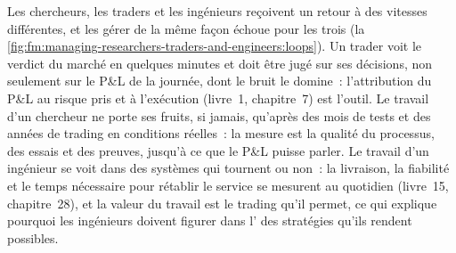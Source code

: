 Les chercheurs, les traders et les ingénieurs reçoivent un retour à des vitesses différentes, et les gérer de la même façon échoue pour les trois
(la \cref{fig:fm:managing-researchers-traders-and-engineers:loops}). Un trader voit le verdict du marché en quelques minutes et doit être jugé sur ses décisions,
non seulement sur le P\&L de la journée, dont le bruit le domine~: l'attribution du P\&L au risque pris et à l'exécution (livre~1, chapitre~7) est
l'outil. Le travail d'un chercheur ne porte ses fruits, si jamais, qu'après des mois de tests et des années de trading en conditions réelles~: la mesure est la qualité du processus, des essais
et des preuves, jusqu'à ce que le P\&L puisse parler. Le travail d'un ingénieur se voit dans des systèmes qui tournent ou non~: la livraison, la fiabilité et le temps nécessaire pour
rétablir le service se mesurent au quotidien (livre~15, chapitre~28), et la valeur du travail est le trading qu'il permet, ce qui explique pourquoi les ingénieurs
doivent figurer dans l' des stratégies qu'ils rendent possibles.

\begin{omfigure}

\label{fig:fm:managing-researchers-traders-and-engineers:loops}
\end{omfigure}

